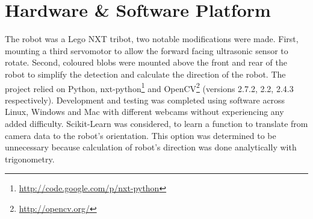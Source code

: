 \section{Hardware \& Software Platform}
\label{section::platform}

The robot was a Lego NXT tribot, two notable modifications were made.  First, mounting a third servomotor to allow the forward facing ultrasonic sensor to rotate. Second, coloured blobs were mounted above the front and rear of the robot to simplify the detection and calculate the direction of the robot. The project relied on Python, nxt-python\footnote{\url{http://code.google.com/p/nxt-python}}  and OpenCV\footnote{\url{http://opencv.org/}}  (versions 2.7.2, 2.2, 2.4.3 respectively). Development and testing was completed using software across Linux, Windows and Mac with different webcams without experiencing any added difficulty. Scikit-Learn was considered, to learn a function to translate from camera data to the robot's orientation.  This option was determined to be unnecessary because calculation of robot’s direction was done analytically with trigonometry.